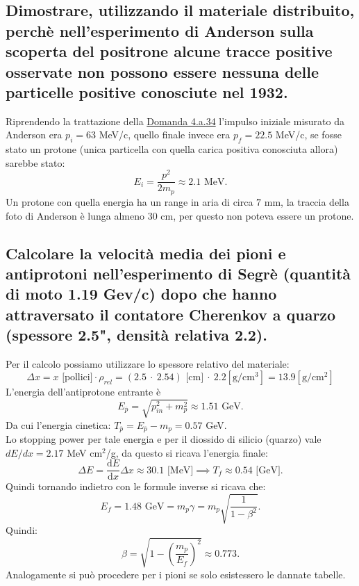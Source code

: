\subsection[\hspace{1mm} ]{Dimostrare, utilizzando il materiale distribuito, perchè nell’esperimento di Anderson sulla scoperta del positrone alcune tracce positive osservate non
possono essere nessuna delle particelle positive conosciute nel 1932.
}
\label{sec:4.b.25}
Riprendendo la trattazione della \hyperref[sec:4.a.34]{Domanda 4.a.34} l'impulso iniziale misurato da Anderson era $p_{i}= 63$ MeV/c, quello finale invece era $p_{f}=22.5$ MeV/c, se fosse stato un protone (unica particella con quella carica positiva conosciuta allora) sarebbe stato:
\[
	E_{i}= \frac{p^2}{2m_{p}}\approx 2.1 \text{ MeV}
.\] 
Un protone con quella energia ha un range in aria di circa $7$ mm, la traccia della foto di Anderson è lunga almeno $30$ cm, per questo non poteva essere un protone.


\subsection[\hspace{1mm} ]{Calcolare la velocità media dei pioni e antiprotoni nell'esperimento di Segrè (quantità di moto 1.19 Gev/c) dopo che hanno attraversato il contatore Cherenkov a quarzo (spessore 2.5", densità relativa 2.2).
}
\label{sec:4.b.26}
Per il calcolo possiamo utilizzare lo spessore relativo del materiale: 
\[
	\Delta x = x \text{ [pollici]}\cdot \rho_{rel}= (2.5 \ \cdot \ 2.54) \text{ [cm]} \ \cdot \ 2.2 \left[\text{g}/\text{cm}^3 \right] = 13.9\left[\text{g}/\text{cm}^2 \right]
\]
L'energia dell'antiprotone entrante è 
\[
	E_{\overline{p}} = \sqrt{ p_{in}^2+m_{p}^2} \approx 1.51 \text{ GeV}
.\] 
Da cui l'energia cinetica: $T_{\overline{p}}= E_{\overline{p}}-m_{p}= 0.57$ GeV.\\
Lo stopping power per tale energia e per il diossido di silicio (quarzo) vale $dE /dx = 2.17$ MeV cm$^2$/g, da questo si ricava l'energia finale:
\[
	\Delta E = \frac{\mbox{d} E}{\mbox{d} x} \Delta x \approx 30.1 \text{ [MeV]} \implies T_{f} \approx 0.54 \text{ [GeV]}
.\] 
Quindi tornando indietro con le formule inverse si ricava che:
\[
	E_{f} = 1.48 \text{ GeV} = m_{p}\gamma = m_{p}\sqrt{\frac{1}{1-\beta^2}} 
.\] 
Quindi:
\[
	\beta = \sqrt{1 - \left( \frac{m_{p}}{E_{f}} \right)^2} \approx 0.773 
.\] 
Analogamente si può procedere per i pioni se solo esistessero le dannate tabelle.



